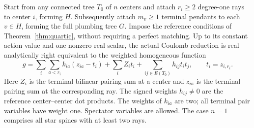 \begin{theorem}\label{thm:blocks}
Start from any connected tree \(T_0\) of \(n\) centers and attach \(r_i\ge 2\) degree-one rays to center \(i\), forming \(H\). Subsequently attach \(m_v\ge1\) terminal pendants to each \(v\in H\), forming the full plumbing tree \(G\). Impose the reference conditions of Theorem~\ref{thm:quartic}, without requiring a perfect matching. Up to its constant action value and one nonzero real scalar, the actual Coulomb reduction is real analytically right equivalent to the weighted homogeneous function
\begin{equation}\label{eq:blocks}
      g=\sum_i\sum_{a<r_i} k_{ia}(z_{ia}-t_i)
        +\sum_i Z_i t_i
        +\sum_{ij\in E(T_0)}h_{ij}t_i t_j,\qquad t_i=z_{i,r_i}.
\end{equation}
Here \(Z_i\) is the terminal bilinear pairing sum at a center and \(z_{ia}\) is the terminal pairing sum at the corresponding ray. The signed weights \(h_{ij}\ne0\) are the reference center--center dot products. The weights of \(k_{ia}\) are two; all terminal pair variables have weight one. Spectator variables are allowed. The case \(n=1\) comprises all star spines with at least two rays.
\end{theorem}
